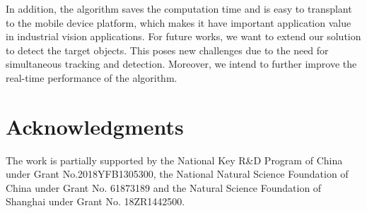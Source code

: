 \documentclass{cta-author}
\begin{document}
In addition, the algorithm saves the computation time and is easy to transplant to the mobile device platform, which makes it have important application value in industrial vision applications. For future works, we want to extend our solution to detect the target objects. This poses new challenges due to the need for simultaneous tracking and detection. Moreover, we intend to further improve the real-time performance of the algorithm.


\section{Acknowledgments}

The work is partially supported by the National Key R\&D Program of China under Grant No.2018YFB1305300, 
the National Natural Science Foundation of China under Grant No. 61873189 and the Natural Science 
Foundation of Shanghai under Grant No. 18ZR1442500.
\end{document}
